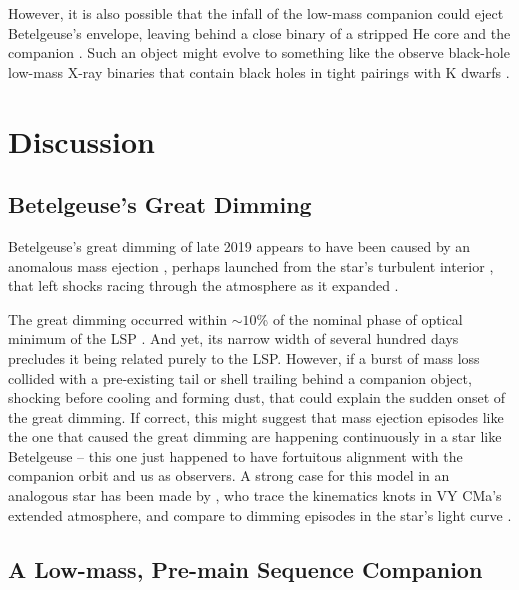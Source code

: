 \documentclass[twocolumn]{aastex631}
\begin{document}
However, it is also possible that the infall of the low-mass companion could eject Betelgeuse's envelope, leaving behind a close binary of a stripped He core and the companion \citep[e.g.][]{1976IAUS...73...75P,1984Natur.309..598V,1987A&A...183...47D,1999ApJ...521..723K}. Such an object might evolve to something like the observe black-hole low-mass X-ray binaries that contain black holes in tight pairings with K dwarfs \citep{2023arXiv230409368M}.  


\section{Discussion}\label{sec:discussion}

\subsection{Betelgeuse's Great Dimming}
Betelgeuse's great dimming of late 2019 appears to have been caused by an anomalous mass ejection \citep{2022ApJ...936...18D}, perhaps launched from the star's turbulent interior \citep{2023ApJ...956...27M}, that left shocks racing through the atmosphere as it expanded \citep{2021A&A...650L..17K,2024A&A...685A.124J}. 

The great dimming occurred within $\sim 10$\% of the nominal phase of optical minimum of the LSP \citep{2022ApJ...936...18D,2023ApJ...956...27M}. And yet, its narrow width of several hundred days precludes it being related purely to the LSP. However, if a burst of mass loss collided with a pre-existing tail or shell trailing behind a companion object, shocking before cooling and forming dust, that could explain the sudden onset of the great dimming. If correct, this might suggest that mass ejection episodes like the one that caused the great dimming are happening continuously in a star like Betelgeuse -- this one just happened to have fortuitous alignment with the companion orbit and us as observers. A strong case for this model in an analogous star has been made by \citet{2021AJ....161...98H}, who trace the kinematics knots in VY CMa's extended atmosphere, and compare to dimming episodes in the star's light curve \citep[also, see]['s conclusions about the connection between the appearance of RW Cephei's disk in interferometric imaging and dimming episodes]{2023AJ....166...78A,2024arXiv240811906A}.  


\subsection{A Low-mass, Pre-main Sequence Companion}
\end{document}
